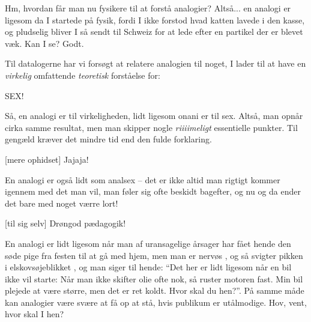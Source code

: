 \documentclass[a4paper,11pt]{article}
\begin{document}
\begin{sketch}
  Hm, hvordan får man nu fysikere til at forstå
analogier?   Altså... en analogi er ligesom da I startede på
fysik, fordi I ikke forstod hvad katten lavede i den kasse, og pludselig bliver
I så sendt til Schweiz for at lede efter en partikel der er blevet væk.  Kan I
se?   Godt.

 Til datalogerne har vi forsøgt at relatere analogien til noget, I lader
til at have en \emph{virkelig} omfattende \emph{teoretisk} forståelse for:

 SEX!

 Så, en analogi er til virkeligheden, lidt ligesom onani er til sex.
Altså, man opnår cirka samme resultat, men man skipper nogle \emph{riiiimeligt}
essentielle punkter.  Til gengæld kræver det mindre tid end den fulde
forklaring.

[mere ophidset] Jajaja!

 En analogi er også lidt som analsex -- det er ikke altid man rigtigt
kommer igennem med det man vil, man føler sig ofte beskidt bagefter, og nu og da
ender det bare med noget værre lort!

[til sig selv] Drøngod pædagogik! 

 En analogi er lidt ligesom når man af uransagelige årsager har fået
hende den søde pige fra festen til at gå med hjem, men man er nervøs
, og så svigter pikken i elskovsøjeblikket , og man siger til hende: ``Det her er lidt ligesom når en bil ikke vil
starte: Når man ikke skifter olie ofte nok, så ruster motoren fast. Min bil
plejede at være større, men det er ret koldt. Hvor skal du hen?''.  På samme
måde kan analogier være svære at få op at stå, 
hvis publikum er utålmodige.  Hov, vent, hvor skal I hen?

\end{sketch}
\end{document}
